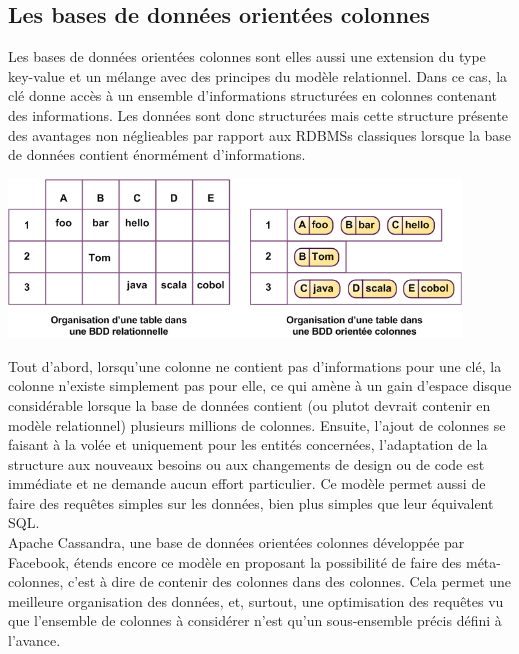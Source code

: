 \documentclass[11pt]{article}
\begin{document}
\subsection{Les bases de données orientées colonnes}
Les bases de données orientées colonnes sont elles aussi une extension du type key-value et un mélange avec des principes du modèle relationnel. Dans ce cas, la clé donne accès à un ensemble d'informations structurées en colonnes contenant des informations. Les données sont donc structurées mais cette structure présente des avantages non néglieables par rapport aux RDBMSs classiques lorsque la base de données contient énormément d'informations. \\
\begin{center}
  \includegraphics[width=12cm]{nosql-colonnes.png}
\end{center}
Tout d'abord, lorsqu'une colonne ne contient pas d'informations pour une clé, la colonne n'existe simplement pas pour elle, ce qui amène à un gain d'espace disque considérable lorsque la base de données contient (ou plutot devrait contenir en modèle relationnel) plusieurs millions de colonnes. Ensuite, l'ajout de colonnes se faisant à la volée et uniquement pour les entités concernées, l'adaptation de la structure aux nouveaux besoins ou aux changements de design ou de code est immédiate et ne demande aucun effort particulier. Ce modèle permet aussi de faire des requêtes simples sur les données, bien plus simples que leur équivalent SQL. \\
Apache Cassandra, une base de données orientées colonnes développée par Facebook, étends encore ce modèle en proposant la possibilité de faire des méta-colonnes, c'est à dire de contenir des colonnes dans des colonnes. Cela permet une meilleure organisation des données, et, surtout, une optimisation des requêtes vu que l'ensemble de colonnes à considérer n'est qu'un sous-ensemble précis défini à l'avance.
\end{document}
